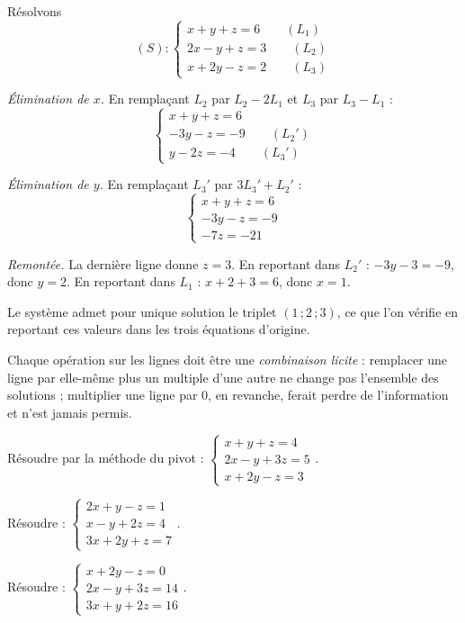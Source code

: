 \begin{exemple}
Résolvons
\[
  (S) : \begin{cases}
    x + y + z = 6 \qquad (L_{1})\\
    2x - y + z = 3 \qquad (L_{2})\\
    x + 2y - z = 2 \qquad (L_{3})
  \end{cases}
\]

\emph{Élimination de $x$.} En remplaçant $L_{2}$ par $L_{2}-2L_{1}$ et $L_{3}$
par $L_{3}-L_{1}$ :
\[
  \begin{cases}
    x + y + z = 6 \\
    -3y - z = -9 \qquad (L_{2}')\\
    y - 2z = -4 \qquad (L_{3}')
  \end{cases}
\]

\emph{Élimination de $y$.} En remplaçant $L_{3}'$ par $3L_{3}'+L_{2}'$ :
\[
  \begin{cases}
    x + y + z = 6 \\
    -3y - z = -9 \\
    -7z = -21
  \end{cases}
\]

\emph{Remontée.} La dernière ligne donne $z = 3$. En reportant dans
$L_{2}'$ : $-3y-3=-9$, donc $y = 2$. En reportant dans $L_{1}$ :
$x+2+3=6$, donc $x=1$.

\smallskip
Le système admet pour unique solution le triplet $(1\,;2\,;3)$, ce que l'on
vérifie en reportant ces valeurs dans les trois équations d'origine.
\end{exemple}

\begin{avertissement}
Chaque opération sur les lignes doit être une \emph{combinaison licite} :
remplacer une ligne par elle-même plus un multiple d'une autre ne change pas
l'ensemble des solutions ; multiplier une ligne par $0$, en revanche, ferait
perdre de l'information et n'est jamais permis.
\end{avertissement}

\begin{entrainement}
\exo[\niveau{2}] Résoudre par la méthode du pivot :
$\begin{cases} x+y+z=4 \\ 2x-y+3z=5 \\ x+2y-z=3 \end{cases}$.

\exo[\niveau{2}] Résoudre :
$\begin{cases} 2x+y-z=1 \\ x-y+2z=4 \\ 3x+2y+z=7 \end{cases}$.

\exo[\niveau{3}] Résoudre :
$\begin{cases} x+2y-z=0 \\ 2x-y+3z=14 \\ 3x+y+2z=16 \end{cases}$.
\end{entrainement}

